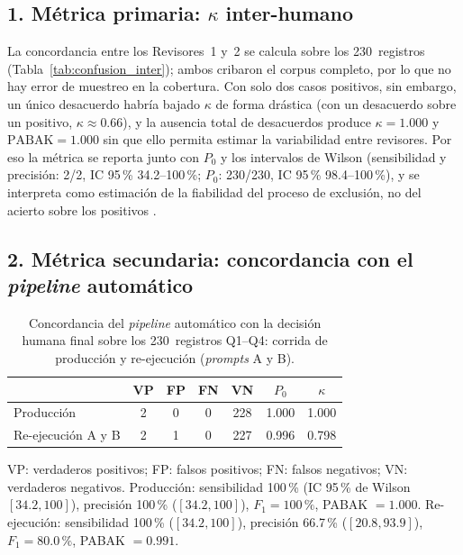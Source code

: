 \subsection*{1. Métrica primaria: $\kappa$ inter-humano}

La concordancia entre los Revisores~1 y~2 se calcula sobre los
230~registros (Tabla~\ref{tab:confusion_inter}); ambos cribaron el corpus
completo, por lo que no hay error de muestreo en la cobertura. Con solo
dos casos positivos, sin embargo, un único desacuerdo habría bajado
$\kappa$ de forma drástica (con un desacuerdo sobre un positivo,
$\kappa\approx0.66$), y la ausencia total de desacuerdos produce
$\kappa=1.000$ y $\text{PABAK}=1.000$ sin que ello permita estimar la
variabilidad entre revisores. Por eso la métrica se reporta junto con
$P_0$ y los intervalos de Wilson (sensibilidad y precisión: 2/2,
IC 95\,\% 34.2--100\,\%; $P_0$: 230/230, IC 95\,\% 98.4--100\,\%), y se
interpreta como estimación de la fiabilidad del proceso de exclusión,
no del acierto sobre los positivos
\parencite{feinstein1990high,byrt1993bias}.

\subsection*{2. Métrica secundaria: concordancia con el \textit{pipeline}
automático}

\begin{table}[H]
\centering
\caption{Concordancia del \textit{pipeline} automático con la decisión
humana final sobre los 230~registros Q1--Q4: corrida de producción y
re-ejecución (\textit{prompts} A y B).}
\label{tab:confusion_llm}
\singlespacing\small
\begin{tabular}{l c c c c c c}
\toprule
 & VP & FP & FN & VN & $P_0$ & $\kappa$ \\
\midrule
Producción & 2 & 0 & 0 & 228 & 1.000 & 1.000 \\
Re-ejecución A y B & 2 & 1 & 0 & 227 & 0.996 & 0.798 \\
\bottomrule
\end{tabular}
\begin{Nota}[Nota]{\linewidth}{VP: verdaderos positivos; FP: falsos
positivos; FN: falsos negativos; VN: verdaderos negativos. Producción:
sensibilidad 100\,\% (IC 95\,\% de Wilson $[34.2,100]$), precisión
100\,\% ($[34.2,100]$), $F_1=100\,\%$, PABAK $=1.000$. Re-ejecución:
sensibilidad 100\,\% ($[34.2,100]$), precisión 66.7\,\% ($[20.8,93.9]$),
$F_1=80.0\,\%$, PABAK $=0.991$.}
\end{Nota}
\end{table}

